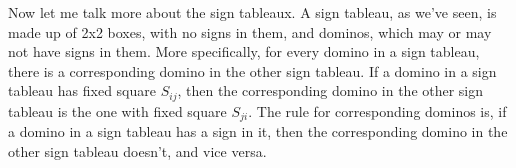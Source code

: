 \documentclass[12pt]{article}
\newcommand{\sij}{{S_{ij}}}
\begin{document}
  Now let me talk more about the sign tableaux.
  A sign tableau, as we've seen, is made up of 2x2 boxes, with no signs in them, and dominos, which may or may not have signs in them.
  More specifically, for every domino in a sign tableau, there is a corresponding domino in the other sign tableau.
  If a domino in a sign tableau has fixed square $\sij$, then the corresponding domino in the other sign tableau is the one with fixed square $S_{ji}$.
  The rule for corresponding dominos is, if a domino in a sign tableau has a sign in it, then the corresponding domino in the other sign tableau doesn't, and vice versa.

\end{document}
